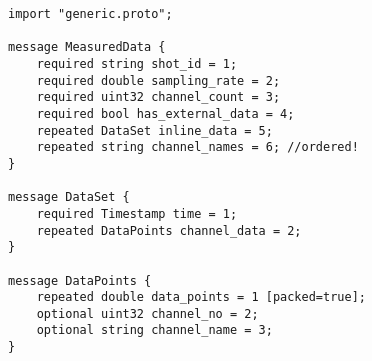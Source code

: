 \begin{verbatim}
import "generic.proto";

message MeasuredData {
    required string shot_id = 1;
    required double sampling_rate = 2;
    required uint32 channel_count = 3;
    required bool has_external_data = 4;
    repeated DataSet inline_data = 5;
    repeated string channel_names = 6; //ordered!
}

message DataSet {
    required Timestamp time = 1;
    repeated DataPoints channel_data = 2;
}

message DataPoints {
    repeated double data_points = 1 [packed=true];
    optional uint32 channel_no = 2;
    optional string channel_name = 3;
}
\end{verbatim}
